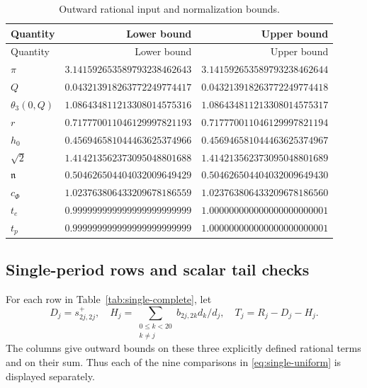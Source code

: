{\footnotesize
\setlength{\tabcolsep}{3pt}
\begin{longtable}{lrr}
\caption{Outward rational input and normalization bounds.}\label{tab:input-bounds}\\
\toprule Quantity & Lower bound & Upper bound\\ \midrule
\endfirsthead
\toprule Quantity & Lower bound & Upper bound\\ \midrule
\endhead
\bottomrule\endfoot
$\pi$ & $3.141592653589793238462643$ & $3.141592653589793238462644$\\
$Q$ & $0.043213918263772249774417$ & $0.043213918263772249774418$\\
$\theta_3(0,Q)$ & $1.086434811213308014575316$ & $1.086434811213308014575317$\\
$r$ & $0.717770011046129997821193$ & $0.717770011046129997821194$\\
$h_0$ & $0.456946581044463625374966$ & $0.456946581044463625374967$\\
$\sqrt2$ & $1.414213562373095048801688$ & $1.414213562373095048801689$\\
$\mathfrak n$ & $0.504626504404032009649429$ & $0.504626504404032009649430$\\
$c_\Phi$ & $1.023763806433209678186559$ & $1.023763806433209678186560$\\
$t_e$ & $0.999999999999999999999999$ & $1.000000000000000000000001$\\
$t_p$ & $0.999999999999999999999999$ & $1.000000000000000000000001$\\
\end{longtable}
}

\subsection{Single-period rows and scalar tail checks}
For each row in Table~\ref{tab:single-complete}, let
\[
 D_j=s^+_{2j,2j},\quad
 H_j=\sum_{\substack{0\le k<20\\k\ne j}}
 b_{2j,2k}d_k/d_j,\quad T_j=R_j-D_j-H_j.
\]
The columns give outward bounds on these three explicitly defined rational
terms and on their sum. Thus each of the nine comparisons in
\eqref{eq:single-uniform} is displayed separately.

